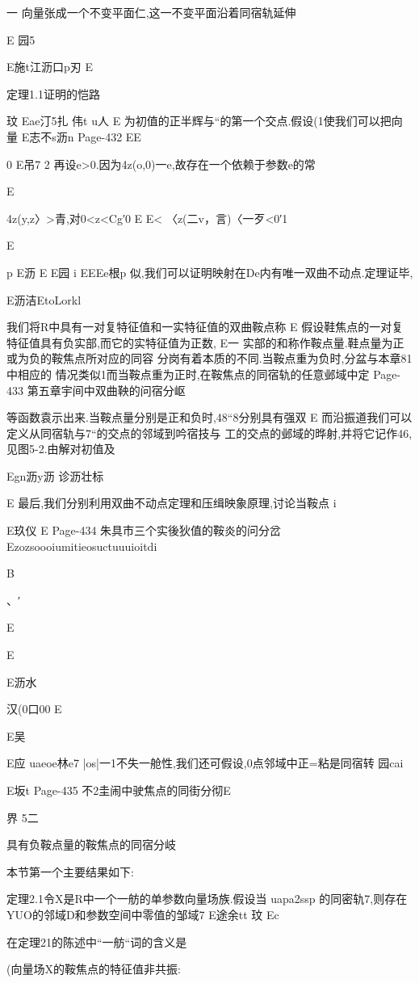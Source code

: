 {{{{{{{一
向量张成一个不变平面仁,这一不变平面沿着同宿轨延伸

E
园5

E施t江沥口p刃
E

定理1.1证明的恺路

玟
Eae汀5扎
伟t
u人
E
为初值的正半辉与“的第一个交点.假设(1使我们可以把向量
E志不s沥n
Page-432
EE

0
E吊7
2
再设e>0.因为4z(o,0)一e,故存在一个依赖于参数e的常

E

4z(y,z〉>青,对0<z<Cg′0
E
E<
〈z(二v，言)〈一歹<0′1

E

p
E沥
E
E园
i
EEEe根p
似,我们可以证明映射在De内有唯一双曲不动点.定理证毕,

E沥洁EtoLorkl

我们将R中具有一对复特征值和一实特征值的双曲鞍点称
E
假设鞋焦点的一对复特征值具有负实部,而它的实特征值为正数,
E一
实部的和称作鞍点量.鞋点量为正或为负的鞍焦点所对应的同容
分岗有着本质的不同.当鞍点重为负时,分盆与本章81中相应的
情况类似1而当鞍点重为正时,在鞍焦点的同宿轨的任意邺域中定
Page-433
第五章宇间中双曲鞅的问宿分岖

等函数袁示出来.当鞍点量分别是正和负时,48“8分别具有强双
E
而沿振道我们可以定义从同宿轨与7“的交点的邻域到吟宿技与
工的交点的邺域的晔射,并将它记作46,见图5-2.由解对初值及

Egn沥y沥
诊沥壮标

E
最后,我们分别利用双曲不动点定理和压缉映象原理,讨论当鞍点
i

E玖仪
E
Page-434
朱具市三个实後狄值的鞍炎的问分岔
Ezozsoooiumitieosuctuuuioitdi

B

、′

E

E

E沥水
{汉(0口00
E

E吴

E应
uaeoe林e7
|os|一1不失一舱性,我们还可假设,0点邻域中正=粘是同宿转
园cai

E坂t
Page-435
不2圭闹中驶焦点的同街分彻E

界
5二

具有负鞍点量的鞍焦点的同宿分岐

本节第一个主要结果如下:

定理2.1令X是R中一个一舫的单参数向量场族.假设当
uapa2ssp
的同密轨7,则存在YUO的邻域D和参数空间中零值的邹域7
E途余tt
玟
Ec

在定理21的陈述中“一舫“词的含义是

(向量场X的鞍焦点的特征值非共振:

}}}}}}}}
